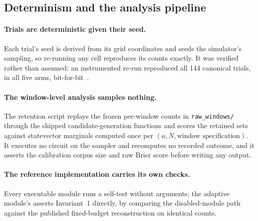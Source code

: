 \documentclass[final,5p,times,longtitle]{elsarticle}
\theoremstyle{plain}
\begin{document}
\subsection{Determinism and the analysis pipeline}

\paragraph{Trials are deterministic given their seed.} Each trial's seed
is derived from its grid coordinates and seeds the simulator's sampling,
so re-running any cell reproduces its counts exactly. It was verified
rather than assumed: an instrumented re-run reproduced all 144 canonical
trials, in all five arms, bit-for-bit~\cite{companion}.

\paragraph{The window-level analysis samples nothing.} The retention
script replays the frozen per-window counts in
\texttt{raw\_windows/} through the shipped candidate-generation
functions and scores the retained sets against statevector marginals
computed once per $(a,N,\text{window specification})$. It executes no
circuit on the sampler and recomputes no recorded outcome, and it asserts
the calibration corpus size and raw Brier score before writing any
output.

\paragraph{The reference implementation carries its own checks.} Every
executable module runs a self-test without arguments; the adaptive
module's asserts Invariant~1 directly, by comparing the disabled-module
path against the published fixed-budget reconstruction on identical
counts.



\end{document}

